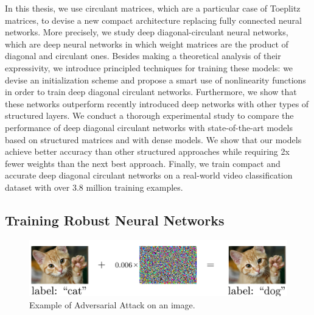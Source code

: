 
In this thesis, we use circulant matrices, which are a particular case of Toeplitz matrices, to devise a new compact architecture replacing fully connected neural networks.
More precisely, we study deep diagonal-circulant neural networks, which are deep neural networks in which weight matrices are the product of diagonal and circulant ones.
Besides making a theoretical analysis of their expressivity, we introduce principled techniques for training these models: we devise an initialization scheme and propose a smart use of nonlinearity functions in order to train deep diagonal circulant networks.
Furthermore, we show that these networks outperform recently introduced deep networks with other types of structured layers.
We conduct a thorough experimental study to compare the performance of deep diagonal circulant networks with state-of-the-art models based on structured matrices and with dense models.
We show that our models achieve better accuracy than other structured approaches while requiring 2x fewer weights than the next best approach.
Finally, we train compact and accurate deep diagonal circulant networks on a real-world video classification dataset with over 3.8 million training examples.





\subsection{Training Robust Neural Networks}
\label{subsection:ch1-training_robust_neural_networks}

\begin{figure}[t]
  \centering
  \includegraphics[width=\textwidth]{figures/main/ch1-introduction/ExampleAdversarialCatDog.pdf}
  \caption{Example of Adversarial Attack on an image.}
  \label{figure:ch1-adversarial_image_example}
\end{figure}

